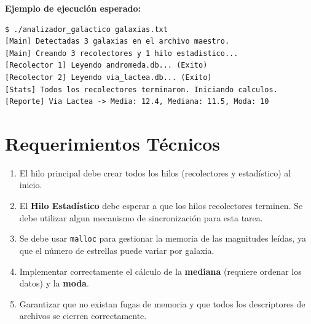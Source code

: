 \documentclass[12pt,a4paper]{article}
\begin{document}
\begin{center}
\end{center}

\textbf{Ejemplo de ejecución esperado:} 
\begin{lstlisting}[numbers=none]
$ ./analizador_galactico galaxias.txt
[Main] Detectadas 3 galaxias en el archivo maestro.
[Main] Creando 3 recolectores y 1 hilo estadistico...
[Recolector 1] Leyendo andromeda.db... (Exito)
[Recolector 2] Leyendo via_lactea.db... (Exito)
[Stats] Todos los recolectores terminaron. Iniciando calculos.
[Reporte] Via Lactea -> Media: 12.4, Mediana: 11.5, Moda: 10
\end{lstlisting}

\section*{Requerimientos Técnicos}
\begin{enumerate}
    \item El hilo principal debe crear todos los hilos (recolectores y estadístico) al inicio.
    \item El \textbf{Hilo Estadístico} debe esperar a que los hilos recolectores terminen. Se debe utilizar algun mecanismo de sincronización para esta tarea.
    \item Se debe usar \texttt{malloc} para gestionar la memoria de las magnitudes leídas, ya que el número de estrellas puede variar por galaxia.
    \item Implementar correctamente el cálculo de la \textbf{mediana} (requiere ordenar los datos) y la \textbf{moda}.
    \item Garantizar que no existan fugas de memoria y que todos los descriptores de archivos se cierren correctamente.
\end{enumerate}
\end{document}
